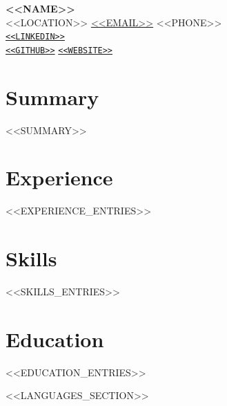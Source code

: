 \documentclass[11pt,a4paper]{article}
\begin{document}
\begin{center}
  {\LARGE\bfseries <<NAME>>} \\[4pt]
  <<LOCATION>> \quad
  \href{mailto:<<EMAIL>>}{<<EMAIL>>} \quad
  <<PHONE>> \\[2pt]
  \href{<<LINKEDIN>>}{\nolinkurl{<<LINKEDIN>>}} \\
  \href{<<GITHUB>>}{\nolinkurl{<<GITHUB>>}} \quad
  \href{<<WEBSITE>>}{\nolinkurl{<<WEBSITE>>}}
\end{center}

\section{Summary}
<<SUMMARY>>

\section{Experience}


<<EXPERIENCE_ENTRIES>>


\section{Skills}
<<SKILLS_ENTRIES>>

\section{Education}

<<EDUCATION_ENTRIES>>

<<LANGUAGES_SECTION>>
\end{document}
